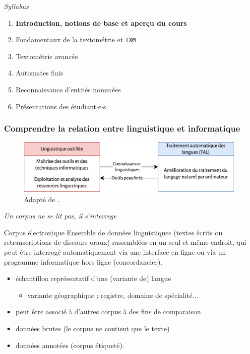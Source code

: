 \documentclass[xetex,xcolor={table,usenames,dvipsnames}]{beamer}
\newcommand{\bolder}[1]{{\color{purple}\bfseries#1}}
\begin{document}
\begin{frame}{\textit{Syllabus}}
	\begin{enumerate}
		\item \bolder{Introduction, notions de base et aperçu du cours}
		\item Fondamentaux de la textométrie et \texttt{TXM}
		\item Textométrie avancée
		\item Automates finis
		\item Reconnaissance d'entités nommées
		\item Présentations des étudiant$\cdot$e$\cdot$s
	\end{enumerate}
\end{frame}

\begin{frame}
    \frametitle{Comprendre la relation entre linguistique et informatique}

\begin{figure}[h] %
	\centering
	\includegraphics[width=\linewidth]{img/linguistique_outillee_TAL.png}
	\caption{Adapté de \textcite{hodac}.}
	\label{fig:ling_out_TAL}
\end{figure}


\end{frame}



\begin{frame}{\og{}\textit{Un corpus ne se lit pas, il s'interroge}\fg{}}
	\begin{block}{Corpus électronique}
		\justifying
		Ensemble de données linguistiques (textes écrits ou retranscriptions de discours oraux) rassemblées en un seul et même endroit, qui peut être interrogé automatiquement via une interface en ligne ou via un programme informatique hors ligne (concordancier).


	\end{block}
		\begin{itemize}
		\item échantillon représentatif d’une (variante de) langue
		\begin{itemize}
			\item  variante géographique ; registre, domaine de spécialité$\dots$
		\end{itemize}
		\item peut être associé à d’autres corpus à des fins de comparaison
		\item données brutes (le corpus ne contient que le texte) 
		\item données annotées (corpus étiqueté). 
	\end{itemize}
\begin{flushright}
\citep{loock2017web}
\end{flushright}
\end{frame}
\end{document}
